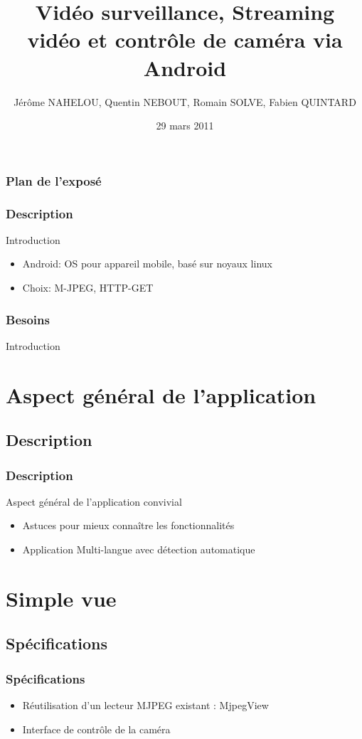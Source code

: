 \documentclass{beamer}
\title{Vidéo surveillance, Streaming vidéo et contrôle de caméra via Android }
\author{\tiny{Jérôme NAHELOU, Quentin NEBOUT, Romain SOLVE, Fabien QUINTARD}}
\institute{\large{Chargé de Projet : Yérom-David Bromberg}\\ \bigskip{}

\small{Université Bordeaux 1}}
\date{29 mars 2011}
\begin{document}
\frame[plain]{\titlepage}


\begin{frame}
\frametitle{Plan de l'exposé}
\tableofcontents[hideallsubsections]
\end{frame}


  \begin{frame}
   \frametitle{Description}
  Introduction
   \begin{itemize}
    \item Android: OS pour appareil mobile, basé sur noyaux linux
    \item Choix: M-JPEG, HTTP-GET
   \end{itemize}
  \end{frame}
  
  \begin{frame}
   \frametitle{Besoins}
  Introduction
  \end{frame}

\section{Aspect général de l'application}
  \subsection{Description}
  \begin{frame}
   \frametitle{Description}
  Aspect général de l'application convivial
   \begin{itemize}
    \item Astuces pour mieux connaître les fonctionnalités
    \item Application Multi-langue avec détection automatique
   \end{itemize}
  \end{frame}

\section{Simple vue}
\subsection{Spécifications}
 \begin{frame}
   \frametitle{Spécifications}
   \begin{itemize}
    \item Réutilisation d'un lecteur MJPEG existant : MjpegView
    \item Interface de contrôle de la caméra
    \end{itemize}
\end{frame}
\end{document}
